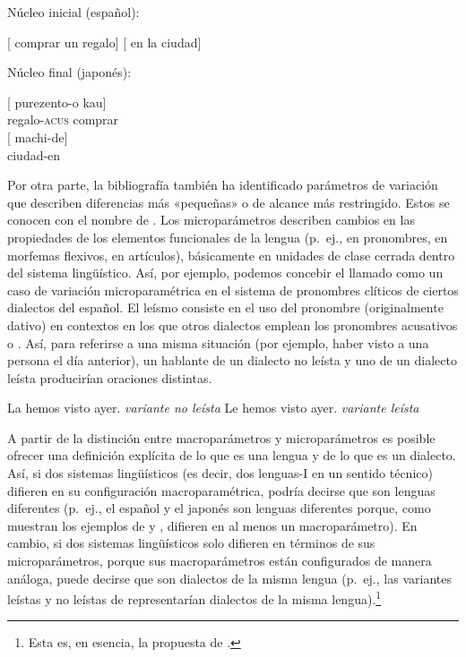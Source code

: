\begin{exe}
  \ex\label{ex:15-espanol} Núcleo inicial (español):
    \begin{xlist}
      \ex {}[ comprar un regalo]
      \ex {}[ en la ciudad]
    \end{xlist}
  \ex\label{ex:15-japones} Núcleo final (japonés):
    \begin{xlist}
      \ex
        \gll {}[ purezento-o kau]\\
             {} regalo-\textsc{acus} comprar\\
        \glt {}
      \ex
        \gll {}[ machi-de]\\
             {} ciudad-en\\
        \glt {}
    \end{xlist}
\end{exe}

Por otra parte, la bibliografía también ha identificado parámetros de variación
que describen diferencias más «pequeñas» o de alcance más restringido. Estos se
conocen con el nombre de . Los microparámetros describen
cambios en las propiedades de los elementos funcionales de la lengua (p.~ej., en
pronombres, en morfemas flexivos, en artículos), básicamente en unidades de
clase cerrada dentro del sistema lingüístico. Así, por ejemplo, podemos concebir
el llamado  como un caso de variación microparamétrica en el
sistema de pronombres clíticos de ciertos dialectos del español. El leísmo
consiste en el uso del pronombre  (originalmente dativo) en contextos
en los que otros dialectos emplean los pronombres acusativos  o
. Así, para referirse a una misma situación (por ejemplo, haber visto a
una persona el día anterior), un hablante de un dialecto no leísta y uno de un
dialecto leísta producirían oraciones distintas.

\begin{exe}
  \ex\label{ex:15-leismo}
    \begin{xlist}
      \ex La hemos visto ayer. \hfill \textit{variante no leísta}
      \ex Le hemos visto ayer. \hfill \textit{variante leísta}
    \end{xlist}
\end{exe}

A partir de la distinción entre macroparámetros y microparámetros es posible
ofrecer una definición explícita de lo que es una lengua y de lo que es un
dialecto. Así, si dos sistemas lingüísticos (es decir, dos lenguas-I en un
sentido técnico) difieren en su configuración macroparamétrica, podría decirse
que son lenguas diferentes (p.~ej., el español y el japonés son lenguas
diferentes porque, como muestran los ejemplos de  y
, difieren en al menos un macroparámetro). En cambio, si dos
sistemas lingüísticos solo difieren en términos de sus microparámetros, porque
sus macroparámetros están configurados de manera análoga, puede decirse que son
dialectos de la misma lengua (p.~ej., las variantes leístas y no leístas de
 representarían dialectos de la misma
lengua).\footnote{Esta es, en esencia, la propuesta de \textcite{baker2008}.}

